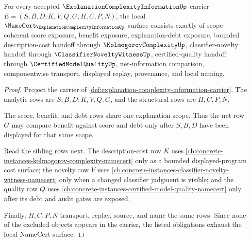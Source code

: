 \begin{theorem}
\label{thm:explanation-complexity-information-namecert-obligations}
For every accepted $\ExplanationComplexityInformationUp$ carrier $E=(S,B,D,K,V,Q,G,H,C,P,N)$, the local $\NameCert_{\ExplanationComplexityInformationUp}$ surface consists exactly of scope-coherent score exposure, benefit exposure, explanation-debt exposure, bounded description-cost handoff through $\KolmogorovComplexityUp$, classifier-novelty handoff through $\ClassifierNoveltyWitnessUp$, certified-quality handoff through $\CertifiedModelQualityUp$, net-information comparison, componentwise transport, displayed replay, provenance, and local naming.
\end{theorem}
\begin{proof}
Project the carrier of \autoref{def:explanation-complexity-information-carrier}. The analytic rows are $S,B,D,K,V,Q,G$, and the structural rows are $H,C,P,N$.

The score, benefit, and debt rows share one explanation scope. Thus the net row $G$ may compare benefit against score and debt only after $S,B,D$ have been displayed for that same scope.

Read the sibling rows next. The description-cost row $K$ uses \autoref{ch:concrete-instances-kolmogorov-complexity-namecert} only as a bounded displayed-program cost surface; the novelty row $V$ uses \autoref{ch:concrete-instances-classifier-novelty-witness-namecert} only when a changed classifier judgment is visible; and the quality row $Q$ uses \autoref{ch:concrete-instances-certified-model-quality-namecert} only after its debt and audit gates are exposed.

Finally, $H,C,P,N$ transport, replay, source, and name the same rows. Since none of the excluded objects appears in the carrier, the listed obligations exhaust the local NameCert surface.
\end{proof}


